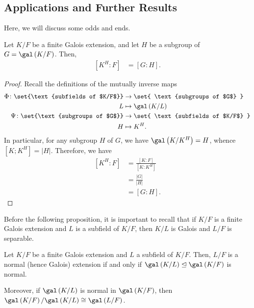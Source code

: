 \documentclass[10pt]{mypackage}
\begin{document}
\subsection{Applications and Further Results}%
Here, we will discuss some odds and ends.
\begin{lemma}
  Let $K/F$ be a finite Galois extension, and let $H$ be a subgroup of $G = \gal\left( K/F \right)$. Then,
  \begin{align*}
    \left[ K^{H}:F \right] &= \left[ G:H \right].
  \end{align*}
\end{lemma}
\begin{proof}
  Recall the definitions of the mutually inverse maps
  \begin{align*}
    \Phi\colon \set{\text{subfields of $K/F$}} &\rightarrow \set{ \text{subgroups of $G$} }\\
    L&\mapsto \gal\left( K/L \right)\\
    \Psi\colon \set{\text{subgroups of $G$}} &\rightarrow \set{ \text{subfields of $K/F$} }\\
    H &\mapsto K^{H}.
  \end{align*}
  In particular, for any subgroup $H$ of $G$, we have $\gal\left( K/K^{H} \right) = H$, whence $\left[ K;K^{H} \right] = \left\vert H \right\vert$. Therefore, we have
  \begin{align*}
    \left[ K^{H}:F \right] &= \frac{\left[ K:F \right]}{\left[ K:K^{H} \right]}\\
                           &= \frac{\left\vert G \right\vert}{\left\vert H \right\vert}\\
                           &= \left[ G:H \right].
  \end{align*}
\end{proof}
Before the following proposition, it is important to recall that if $K/F$ is a finite Galois extension and $L$ is a subfield of $K/F$, then $K/L$ is Galois and $L/F$ is separable.
\begin{proposition}
  Let $K/F$ be a finite Galois extension and $L$ a subfield of $K/F$. Then, $L/F$ is a normal (hence Galois) extension if and only if $\gal\left( K/L \right)\trianglelefteq \gal\left( K/F \right)$ is normal.

  Moreover, if $\gal\left( K/L \right)$ is normal in $\gal\left( K/F \right)$, then $\gal\left( K/F \right)/\gal\left( K/L \right)\cong \gal\left( L/F \right)$.
\end{proposition}
\end{document}
